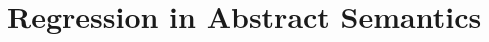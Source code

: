 \def\rbjidregress{$$Id: regress.tex,v 1.1 2011/10/25 09:10:45 rbj Exp $$}

\section{Regression in Abstract Semantics}\label{RegressionInAbstractSemantics}

